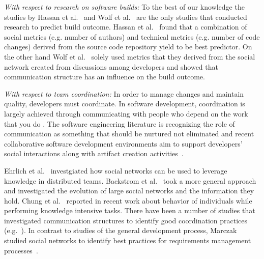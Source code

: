 \emph{With respect to research on software builds:}
To the best of our knowledge the studies by Hassan et al.~\cite{hassan:ase:2006}
and Wolf et al.~\cite{wolf:icse:2009} are the only studies that conducted
research to predict build outcome. Hassan et al.~\cite{hassan:ase:2006} found
that a combination of social metrics (e.g. number of authors) and technical
metrics (e.g. number of code changes) derived from the source code repository
yield to be best predictor. On the other hand Wolf et al.~\cite{wolf:icse:2009}
solely used metrics that they derived from the social network created from
discussions among developers and showed that communication structure has an
influence on the build outcome.

\emph{With respect to team coordination:}
In
order to manage changes and maintain quality, developers must coordinate. In
software development, coordination is largely achieved through communicating with
people who depend on the work that you do \cite{kraut:1995coordination}. The
software engineering literature is recognizing the role of communication as
something that should be nurtured not eliminated and recent
collaborative software development environments aim to support developers'
social interactions along with artifact creation activities~\cite{nakakoji2010:rdc}.


Ehrlich et al.~\cite{ehrlich:icgse:2006} investgiated how social networks can be
used to leverage knowledge in distributed teams. Backstrom et
al.~\cite{backstrom:kdd:2006} took a more general approach and investigated the
evolution of large social networks and the information they hold. Chung et
al.~\cite{chung:cpr:07} reported in recent work about behavior of individuals
while performing knowledge intensive tasks. There have been a number of studies
that investigated communication structures to identify good
coordination practices
(e.g.~\cite{hinds:cscw:2006,hossain:cscw:2006,bird:fse:2008,hinds:hicss:2008}). In contrast to studies of the general development process, Marczak studied social
networks to identify best practices for requirements management
processes~\cite{marczak:re:2008}.

